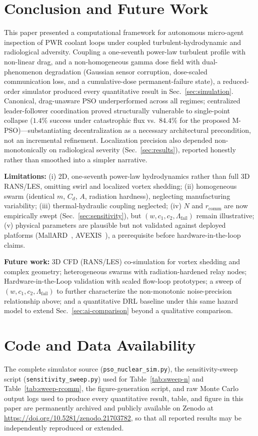 \documentclass[conference]{IEEEtran}
\begin{document}
\section{Conclusion and Future Work}
\label{sec:conclusion}

This paper presented a computational framework for autonomous micro-agent inspection of PWR coolant loops under coupled turbulent-hydrodynamic and radiological adversity. Coupling a one-seventh power-law turbulent profile with non-linear drag, and a non-homogeneous gamma dose field with dual-phenomenon degradation (Gaussian sensor corruption, dose-scaled communication loss, and a cumulative-dose permanent-failure state), a reduced-order simulator produced every quantitative result in Sec.~\ref{sec:simulation}. Canonical, drag-unaware PSO underperformed across all regimes; centralized leader-follower coordination proved structurally vulnerable to single-point collapse ($1.4\%$ success under catastrophic flux vs.\ $84.4\%$ for the proposed M-PSO)---substantiating decentralization as a necessary architectural precondition, not an incremental refinement. Localization precision also depended non-monotonically on radiological severity (Sec.~\ref{sec:results}), reported honestly rather than smoothed into a simpler narrative.

\textbf{Limitations:} (i) 2D, one-seventh power-law hydrodynamics rather than full 3D RANS/LES, omitting swirl and localized vortex shedding; (ii) homogeneous swarm (identical $m$, $C_d$, $A$, radiation hardness), neglecting manufacturing variability; (iii) thermal-hydraulic coupling neglected; (iv) $N$ and $r_{\text{comm}}$ are now empirically swept (Sec.~\ref{sec:sensitivity}), but $(w,c_1,c_2,\Lambda_{\text{fail}})$ remain illustrative; (v) physical parameters are plausible but not validated against deployed platforms (MallARD~\cite{groves_mallard}, AVEXIS~\cite{nancekievill_avexis}), a prerequisite before hardware-in-the-loop claims.

\textbf{Future work:} 3D CFD (RANS/LES) co-simulation for vortex shedding and complex geometry; heterogeneous swarms with radiation-hardened relay nodes; Hardware-in-the-Loop validation with scaled flow-loop prototypes; a sweep of $(w,c_1,c_2,\Lambda_{\text{fail}})$ to further characterize the non-monotonic noise-precision relationship above; and a quantitative DRL baseline under this same hazard model to extend Sec.~\ref{sec:ai-comparison} beyond a qualitative comparison.

\section*{Code and Data Availability}
\label{sec:avail}
The complete simulator source (\texttt{pso\_nuclear\_sim.py}), the sensitivity-sweep script (\texttt{sensitivity\_sweep.py}) used for Table~\ref{tab:sweep-n} and Table~\ref{tab:sweep-rcomm}, the figure-generation script, and raw Monte Carlo output logs used to produce every quantitative result, table, and figure in this paper are permanently archived and publicly available on Zenodo at \url{https://doi.org/10.5281/zenodo.21703782}, so that all reported results may be independently reproduced or extended.
\end{document}
